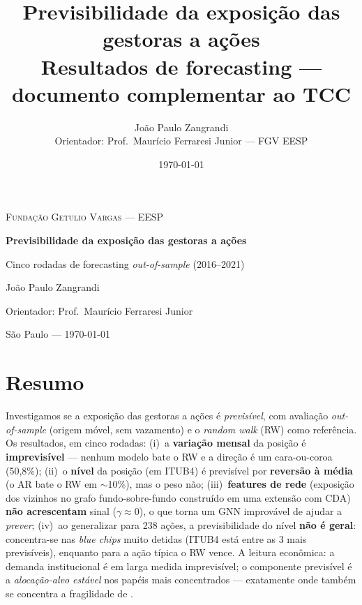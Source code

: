 \documentclass[12pt,a4paper]{article}
\title{\textbf{Previsibilidade da exposição das gestoras a ações} \\[0.4em]
\large Resultados de forecasting --- documento complementar ao TCC}
\author{João Paulo Zangrandi \\ \small Orientador: Prof.\ Maurício Ferraresi Junior --- FGV EESP}
\date{\today}
\begin{document}
\begin{titlepage}
\centering
\vspace*{1.5cm}
{\scshape\large Fundação Getulio Vargas --- EESP\par}
\vspace{2.5cm}
{\huge\bfseries Previsibilidade da exposição das gestoras a ações\par}
\vspace{0.6cm}
{\Large Cinco rodadas de forecasting \emph{out-of-sample} (2016--2021)\par}
\vspace{3cm}
{\Large João Paulo Zangrandi\par}
\vspace{0.4cm}
{\large Orientador: Prof.\ Maurício Ferraresi Junior\par}
\vfill
{\large São Paulo --- \today\par}
\end{titlepage}

\section*{Resumo}
Investigamos se a exposição das gestoras a ações é \emph{previsível}, com avaliação \emph{out-of-sample}
(origem móvel, sem vazamento) e o \emph{random walk} (RW) como referência. Os resultados, em cinco rodadas:
(i)~a \textbf{variação mensal} da posição é \textbf{imprevisível} --- nenhum modelo bate o RW e a direção é
um cara-ou-coroa (50,8\%); (ii)~o \textbf{nível} da posição (em ITUB4) é previsível por \textbf{reversão à
média} (o AR bate o RW em $\sim$10\%), mas o peso não; (iii)~\textbf{features de rede} (exposição dos
vizinhos no grafo fundo-sobre-fundo construído em uma extensão com CDA) \textbf{não acrescentam} sinal
($\gamma\approx0$), o que torna um GNN improvável de ajudar a \emph{prever}; (iv)~ao generalizar para 238 ações, a previsibilidade do nível
\textbf{não é geral}: concentra-se nas \emph{blue chips} muito detidas (ITUB4 está entre as 3 mais
previsíveis), enquanto para a ação típica o RW vence. A leitura econômica: a demanda institucional é em larga
medida imprevisível; o componente previsível é a \emph{alocação-alvo estável} nos papéis mais concentrados ---
exatamente onde também se concentra a fragilidade de \citet{greenwoodthesmar2011}.

\newpage
\tableofcontents
\newpage
\end{document}
